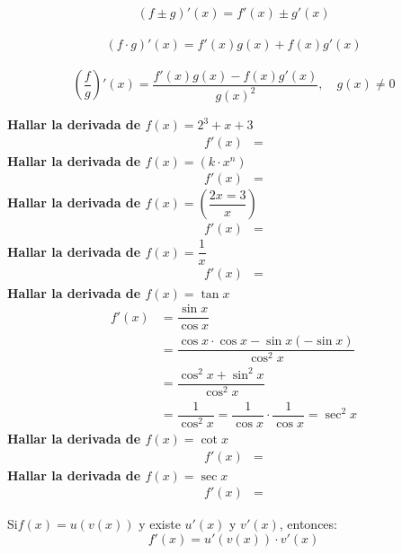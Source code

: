 \documentclass[12pt,a4paper,fleqn]{article}
\begin{document}
\begin{tcolorbox}[colback=white!95!blue, colframe=blue!40!black, title=Teoremas de Álgebra de Derivadas]
	\[
		(f \pm g)'(x) = f'(x) \pm g'(x)
	\]\
	\[
		(f \cdot g)'(x) = f'(x) g(x) + f(x) g'(x)
	\]\
	\[
		\left( \frac{f}{g} \right)'(x) = \frac{f'(x) g(x) - f(x) g'(x)}{g(x)^2}, \quad g(x) \neq 0
	\]
\end{tcolorbox}
\textbf{Hallar la derivada de $f(x)= 2^3 + x+3$}
\begin{align*}
	f'(x) & =
\end{align*}
\textbf{Hallar la derivada de $f(x)=(k \cdot x^n)$}
\begin{align*}
	f'(x) & =
\end{align*}
\textbf{Hallar la derivada de $f(x)=\left(\dfrac{2x=3}{x}\right)$}
\begin{align*}
	f'(x) & =
\end{align*}
\textbf{Hallar la derivada de $f(x)=\dfrac{1}{x}$}
\begin{align*}
	f'(x) & =
\end{align*}
\textbf{Hallar la derivada de $f(x)=\tan x$}
\begin{align*}
	f'(x) & = \dfrac{\sin x}{\cos x}\\
	      & = \dfrac{\cos x \cdot \cos x - \sin x (-\sin x)}{\cos^2 x}\\
	      & = \dfrac{\cos^2 x + \sin^2 x}{\cos^2 x}\\
	      & = \dfrac{1}{\cos^2 x}=\dfrac{1}{\cos x}\cdot\dfrac{1}{\cos x}=\sec^2 x
\end{align*}
\textbf{Hallar la derivada de $f(x)=\cot x$}
\begin{align*}
	f'(x) & =
\end{align*}
\textbf{Hallar la derivada de $f(x)=\sec x$}
\begin{align*}
	f'(x) & =
\end{align*}
\begin{tcolorbox}[colback=white!95!blue, colframe=blue!40!black, title=Regla de la cadena]
    Si$f(x)=u(v(x))$ y existe $u'(x)$ y $v'(x)$, entonces:
	\[
		f'(x)=u'(v(x))\cdot v'(x)
	\]
\end{tcolorbox}
\end{document}
